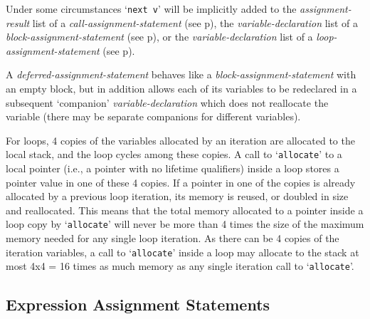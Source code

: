 \documentclass[12pt]{article}
\newcommand{\pagref}[1]{p\pageref{#1}}
\begin{document}
Under some circumstances `{\tt next v}' will
be implicitly added to the {\em assignment-result}
list of a {\em call-assignment-statement} (see \pagref{CALL-NEXT-PROMOTION}),
the {\em variable-declaration} list
of a {\em block-assignment-statement} (see \pagref{BLOCK-NEXT-PROMOTION}),
or the {\em variable-declaration} list of a
{\em loop-assignment-statement} (see \pagref{LOOP-NEXT-PROMOTION}).

A {\em deferred-assignment-statement}
behaves like a {\em block-assignment-statement} with an empty block,
but in addition allows each of its variables to be redeclared in a subsequent
`companion' {\em variable-declaration} which does not
reallocate the variable (there may be separate companions for different
variables).

For loops\label{LOOP-ALLOCATION},
4 copies of the variables allocated by an iteration
are allocated to the local stack,
and the loop cycles among these copies.
A call to `{\tt allocate}' to a local pointer (i.e., a pointer with no
lifetime qualifiers) inside a loop stores a pointer value in
one of these 4 copies.  If a pointer in one of the copies is already
allocated by a previous loop iteration, its memory is reused, or
doubled in size and reallocated.  This means that the total memory allocated
to a pointer inside a loop copy by `{\tt allocate}' will never be more than
4 times the size of the maximum memory needed for any single loop
iteration.  As there can be 4 copies of the iteration variables,
a call to `{\tt allocate}' inside a loop
may allocate to the stack at most 4x4 = 16 times as much
memory as any single iteration call to `{\tt allocate}'.


\subsection{Expression Assignment Statements}
\label{EXPRESSION-ASSIGNMENT-STATEMENTS}
\end{document}
